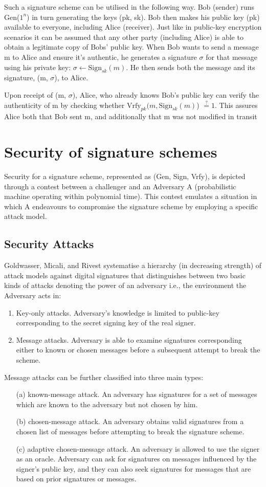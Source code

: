 \documentclass[]{final_report}
\theoremstyle{definition}
\begin{document}
Such a signature scheme can be utilised in the following way.
Bob (sender) runs Gen($1^n$) in turn generating the keys (pk, sk). Bob then makes his public key (pk) available to everyone, including Alice (receiver). Just like in public-key encryption scenarios it can be assumed that any other party (including Alice) is able to obtain a legitimate copy of Bobs' public key. 
When Bob wants to send a message m to Alice and ensure it's authentic, he generates a signature $\sigma$ for that message using his private key: $\sigma \leftarrow \text{Sign}_{sk}(m)$. He then sends both the message and its signature, (m, $\sigma$), to Alice.

Upon receipt of (m, $\sigma$), Alice, who already knows Bob's public key can verify the authenticity of m by checking whether $\text{Vrfy}_{pk} (m, \text{Sign}_{sk}(m)$) $\stackrel{?}{=} 1$. This assures Alice both that Bob sent m, and additionally that m was not modified in transit

\section{Security of signature schemes}
Security for a signature scheme, represented as (Gen, Sign, Vrfy), is depicted through a contest between a challenger and an Adversary A (probabilistic machine operating within polynomial time). This contest emulates a situation in which A endeavours to compromise the signature scheme by employing a specific attack model. 
\subsection{Security Attacks}

Goldwasser, Micali, and Rivest systematise a hierarchy (in decreasing strength) of attack models against digital signatures that distinguishes between two basic kinds of attacks denoting the power of an adversary i.e., the environment the Adversary acts in:
\begin{enumerate}
    \item Key-only attacks. Adversary's knowledge is limited to public-key corresponding to the secret signing key of the real signer.
    \item Message attacks. Adversary is able to examine signatures corresponding either to known or chosen messages before a subsequent  attempt to break the scheme.
\end{enumerate}
Message attacks can be further classified into three main types:
\begin{itemize}
    \item [(a)] known-message attack. An adversary has signatures for a set of messages which are known to the adversary but not chosen by him.
    \item [(b)] chosen-message attack. An adversary obtains valid signatures from a chosen list of messages before attempting to break the signature scheme. 
    \item [(c)] adaptive chosen-message attack. An adversary is allowed to use the signer as an oracle. Adversary can ask for signatures on messages influenced by the signer's public key, and they can also seek signatures for messages that are based on prior signatures or messages.
\end{itemize}
\end{document}
